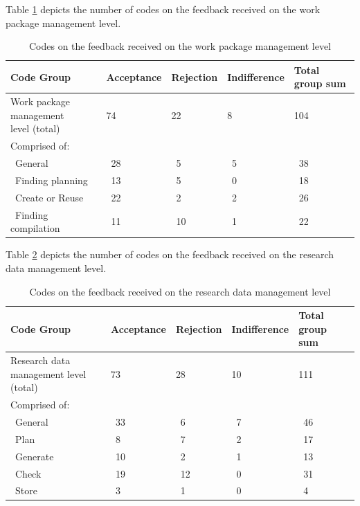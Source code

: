 \documentclass{bausteinefdm}
\begin{document}
Table \ref{tab:DescriptiveFeedback_mid} depicts the number of codes on the feedback received on the work package management level.


\begin{table}[ht]
    \begin{tabularx}{\textwidth}{l|X|X|X||X}
        \textbf{Code Group} & \textbf{Acceptance} & \textbf{Rejection} & \textbf{Indifference} & \textbf{Total group sum}  \\
        \toprule
        \makecell[l]{Work package management\\level (total)} & 74 & 22 & 8 & 104 \\
        \midrule
        \midrule
        Comprised of: &  &  &  &  \\
        \, General & \, 28 & \, 5 & \, 5 & \, 38 \\
        \, Finding planning & \, 13 & \, 5 & \, 0 & \, 18 \\
        \, Create or Reuse & \, 22 & \, 2 & \, 2 & \,  26\\
        \, Finding compilation & \, 11 & \, 10 & \, 1 & \, 22 \\
    \end{tabularx}
    \caption{Codes on the feedback received on the work package management level}
    \label{tab:DescriptiveFeedback_mid}
\end{table}


Table \ref{tab:DescriptiveFeedback_low} depicts the number of codes on the feedback received on the research data management level.

\begin{table}[ht]
    \begin{tabularx}{\textwidth}{l|X|X|X||X}
        \textbf{Code Group} & \textbf{Acceptance} & \textbf{Rejection} & \textbf{Indifference} & \textbf{Total group sum}  \\
        \toprule
        \makecell[l]{Research data management level\\(total)} & 73 & 28 & 10 & 111 \\
        \midrule
        \midrule
        Comprised of: &  &  &  &  \\
        \, General & \, 33 & \, 6 & \, 7  & \, 46 \\
        \, Plan & \, 8 & \, 7 & \, 2 & \, 17 \\
        \, Generate & \, 10 & \, 2 & \, 1 & \, 13 \\
        \, Check & \, 19 & \, 12 & \, 0 & \, 31 \\
        \, Store & \, 3 & \, 1 & \, 0 & \, 4 \\
    \end{tabularx}
    \caption{Codes on the feedback received on the research data management level}
    \label{tab:DescriptiveFeedback_low}
\end{table}
\end{document}
